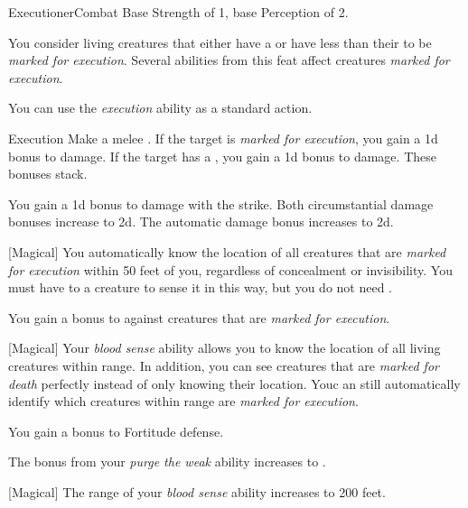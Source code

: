     \begin{feat}{Executioner}{Combat}
        \featpres Base Strength of 1, base Perception of 2.

         You consider living creatures that either have a  or have less than their  to be \textit{marked for execution}.
        Several abilities from this feat affect creatures \textit{marked for execution}.

         You can use the \textit{execution} ability as a standard action.
        \begin{freeability}{Execution}
            Make a melee .
            If the target is \textit{marked for execution}, you gain a \plus1d bonus to damage.
            If the target has a , you gain a \plus1d bonus to damage.
            These bonuses stack.

            \rankline
             You gain a \plus1d bonus to damage with the strike.
             Both circumstantial damage bonuses increase to \plus2d.
             The automatic damage bonus increases to \plus2d.
        \end{freeability}

        [Magical] You automatically know the location of all creatures that are \textit{marked for execution} within 50 feet of you, regardless of concealment or invisibility.
        You must have  to a creature to sense it in this way, but you do not need .

         You gain a  bonus to  against creatures that are \textit{marked for execution}.

        [Magical] Your \textit{blood sense} ability allows you to know the location of all living creatures within range.
        In addition, you can see creatures that are \textit{marked for death} perfectly instead of only knowing their location.
        Youc an still automatically identify which creatures within range are \textit{marked for execution}.

         You gain a  bonus to Fortitude defense.

         The bonus from your \textit{purge the weak} ability increases to .

        [Magical] The range of your \textit{blood sense} ability increases to 200 feet.
    \end{feat}

